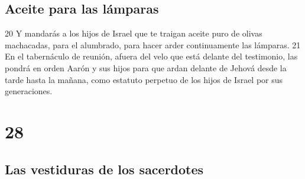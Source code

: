 \section*{Aceite para las lámparas}

20 Y mandarás a los hijos de Israel que te traigan aceite puro de olivas machacadas, para el alumbrado, para hacer arder continuamente las lámparas.
21 En el tabernáculo de reunión, afuera del velo que está delante del testimonio, las pondrá en orden Aarón y sus hijos para que ardan delante de Jehová desde la tarde hasta la mañana, como estatuto perpetuo de los hijos de Israel por sus generaciones.

\chapter{28}

\section*{Las vestiduras de los sacerdotes}

